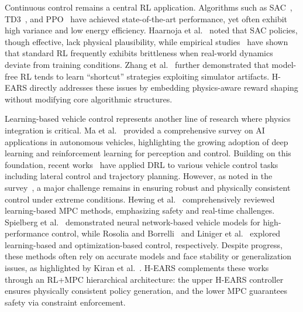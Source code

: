 \documentclass[journal]{IEEEtran}
\begin{document}
	Continuous control remains a central RL application. Algorithms such as SAC~\cite{haarnoja2018soft}, TD3~\cite{fujimoto2018addressing}, and PPO~\cite{schulman2017proximal} have achieved state-of-the-art performance, yet often exhibit high variance and low energy efficiency. Haarnoja et al.~\cite{haarnoja2018applications} noted that SAC policies, though effective, lack physical plausibility, while empirical studies~\cite{cobbe2019quantifying} have shown that standard RL frequently exhibits brittleness when real-world dynamics deviate from training conditions. Zhang et al.~\cite{zhang2021learning} further demonstrated that model-free RL tends to learn “shortcut” strategies exploiting simulator artifacts. H-EARS directly addresses these issues by embedding physics-aware reward shaping without modifying core algorithmic structures.
	
	Learning-based vehicle control represents another line of research where physics integration is critical. Ma et al.~\cite{ma2020artificial} provided a comprehensive survey on AI applications in autonomous vehicles, highlighting the growing adoption of deep learning and reinforcement learning for perception and control. Building on this foundation, recent works~\cite{peng2021end} have applied DRL to various vehicle control tasks including lateral control and trajectory planning. However, as noted in the survey~\cite{ma2020artificial}, a major challenge remains in ensuring robust and physically consistent control under extreme conditions. Hewing et al.~\cite{hewing2020learning} comprehensively reviewed learning-based MPC methods, emphasizing safety and real-time challenges. Spielberg et al.~\cite{spielberg2019neural} demonstrated neural network-based vehicle models for high-performance control, while Rosolia and Borrelli~\cite{rosolia2017learning} and Liniger et al.~\cite{liniger2015optimization} explored learning-based and optimization-based control, respectively. Despite progress, these methods often rely on accurate models and face stability or generalization issues, as highlighted by Kiran et al.~\cite{kiran2022deep}. H-EARS complements these works through an RL+MPC hierarchical architecture: the upper H-EARS controller ensures physically consistent policy generation, and the lower MPC guarantees safety via constraint enforcement.
	
\end{document}

